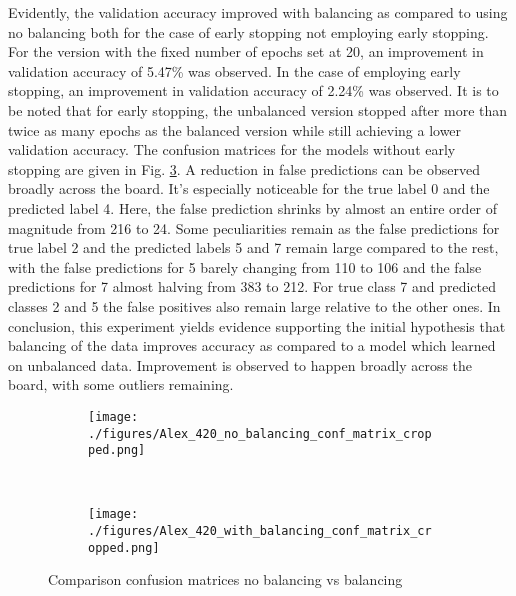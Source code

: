 Evidently, the validation accuracy improved with balancing as compared to using no balancing both for the case of early stopping not employing early stopping. For the version with the fixed number of epochs set at 20, an improvement in validation accuracy of 5.47\% was observed. In the case of employing early stopping, an improvement in validation accuracy of 2.24\% was observed. It is to be noted that for early stopping, the unbalanced version stopped after more than twice as many epochs as the balanced version while still achieving a lower validation accuracy. The confusion matrices for the models without early stopping are given in Fig. \ref{fig:balancingcombined}. A reduction in false predictions can be observed broadly across the board. It's especially noticeable for the true label 0 and the predicted label 4. Here, the false prediction shrinks by almost an entire order of magnitude from 216 to 24. Some peculiarities remain as the false predictions for true label 2 and the predicted labels 5 and 7 remain large compared to the rest, with the false predictions for 5 barely changing from 110 to 106 and the false predictions for 7 almost halving from 383 to 212. For true class 7 and predicted classes 2 and 5 the false positives also remain large relative to the other ones. In conclusion, this experiment yields evidence supporting the initial hypothesis that balancing of the data improves accuracy as compared to a model which learned on unbalanced data. Improvement is observed to happen broadly across the board, with some outliers remaining.
\begin{figure}[h]
	\centering
	\begin{subfigure}{0.49\columnwidth}
		\texttt{[image: ./figures/Alex\_420\_no\_balancing\_conf\_matrix\_cropped.png]}
		\label{fig:nobalancing}
	\end{subfigure} 
	~
	\begin{subfigure}{0.49\columnwidth}
		\texttt{[image: ./figures/Alex\_420\_with\_balancing\_conf\_matrix\_cropped.png]}
		\label{fig:balancing}
	\end{subfigure}
	\caption{Comparison confusion matrices no balancing vs balancing}
	\label{fig:balancingcombined}
\end{figure}



